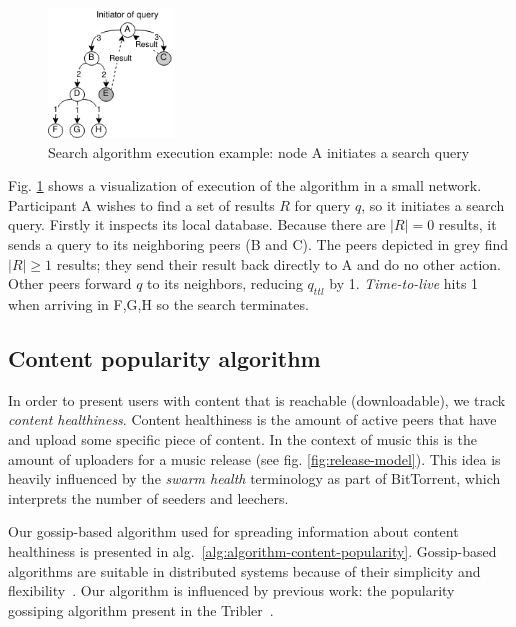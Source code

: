 

\begin{figure}
    \centering
    \includegraphics[width=0.3\textwidth]{design/search-algorithm-diagram.png}
    \caption{Search algorithm execution example: node A initiates a search query}
    \label{fig:search-algorithm-diagram}
\end{figure}

Fig. \ref{fig:search-algorithm-diagram} shows a visualization of execution of the algorithm in a small network. Participant A wishes to find a set of results $R$ for query $q$, so it initiates a search query. Firstly it inspects its local database. Because there are $|R|=0$ results, it sends a query to its neighboring peers (B and C). The peers depicted in grey find $|R|\geq 1$ results; they send their result back directly to A and do no other action. Other peers forward $q$ to its neighbors, reducing $q_{ttl}$ by 1. \textit{Time-to-live} hits 1 when arriving in F,G,H so the search terminates. 

\subsection{Content popularity algorithm}
In order to present users with content that is reachable (downloadable), we track \textit{content healthiness}. Content healthiness is the amount of active peers that have and upload some specific piece of content. In the context of music this is the amount of uploaders for a music release (see fig. \ref{fig:release-model}). This idea is heavily influenced by the \textit{swarm health} terminology as part of BitTorrent, which interprets the number of seeders and leechers.


Our gossip-based algorithm used for spreading information about content healthiness is presented in alg.~\ref{alg:algorithm-content-popularity}. Gossip-based algorithms are suitable in distributed systems because of their simplicity and flexibility~\citep{kermarrec2007gossiping}. Our algorithm is influenced by previous work: the popularity gossiping algorithm present in the Tribler~\citep{pouwelse2008tribler}. 

